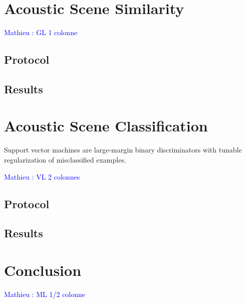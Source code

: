 \documentclass[journal]{IEEEtran}
\newcommand{\ml}[1]{\textcolor{blue}{ Mathieu : #1}}
\begin{document}
\section{Acoustic Scene Similarity}

\ml{GL 1 colonne}



\subsection{Protocol}

\subsection{Results}

\section{Acoustic Scene Classification}
Support vector machines are large-margin binary discriminators with tunable regularization of misclassified examples.

\ml{VL 2 colonnes}

\subsection{Protocol}

\subsection{Results}


\section{Conclusion}

\ml{ML 1/2 colonne}




% 
\end{document}
